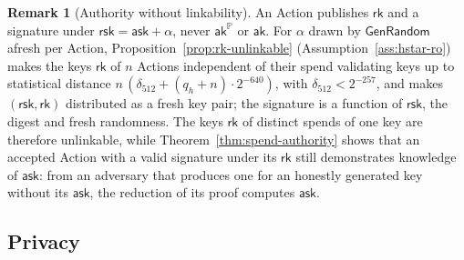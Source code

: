 \documentclass[11pt,a4paper]{article}
\theoremstyle{definition}
\newtheorem{remark}[theorem]{Remark}
\newcommand{\PP}{\mathbb{P}}
\newcommand{\rk}{\mathsf{rk}}
\newcommand{\ask}{\ensuremath{\mathsf{ask}}}
\newcommand{\aksym}{\ensuremath{\mathsf{ak}}}
\newcommand{\rsk}{\ensuremath{\mathsf{rsk}}}
\begin{document}
\begin{remark}[Authority without linkability]
An Action publishes $\rk$ and a signature under $\rsk = \ask + \alpha$,
never $\aksym^{\PP}$ or $\aksym$. For $\alpha$ drawn by $\mathsf{GenRandom}$
afresh per Action, Proposition~\ref{prop:rk-unlinkable}
(Assumption~\ref{ass:hstar-ro}) makes the keys $\rk$ of $n$ Actions
independent of their spend validating keys up to statistical distance
$n\,(\delta_{512} + (q_h + n) \cdot 2^{-640})$, with
$\delta_{512} < 2^{-257}$, and makes $(\rsk, \rk)$ distributed as a fresh
key pair; the signature is a function of $\rsk$, the digest and fresh
randomness. The keys $\rk$ of distinct spends of one key are therefore
unlinkable, while Theorem~\ref{thm:spend-authority} shows that an accepted
Action with a valid signature under its $\rk$ still demonstrates knowledge
of $\ask$: from an adversary that produces one for an honestly generated key
without its $\ask$, the reduction of its proof computes $\ask$.
\end{remark}

\subsection{Privacy}\label{sec:security-privacy}
\end{document}
